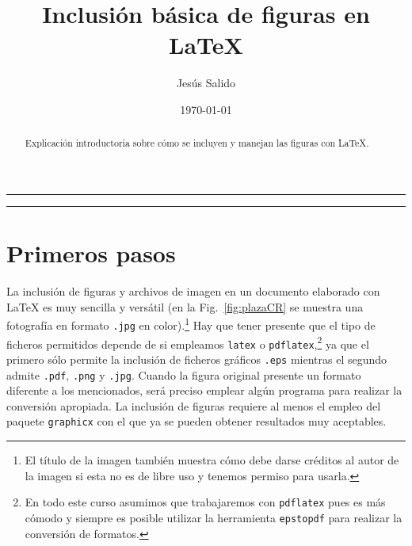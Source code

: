 \documentclass[11pt,a4paper]{article}
\author{Jesús Salido}
\title{Inclusión básica de figuras en \LaTeX{}}
\date{\today}
\begin{document}
\maketitle

\begin{abstract}
	Explicación introductoria sobre cómo se incluyen y manejan las figuras con \LaTeX{}.
\end{abstract}

\hrule
\tableofcontents
\listoffigures
\bigskip
\hrule

\section{Primeros pasos}
La inclusión de figuras y archivos de imagen en un documento elaborado con \LaTeX{} es muy sencilla y versátil (en la Fig.~\ref{fig:plazaCR} se muestra una fotografía en formato \texttt{.jpg} en color).\footnote{El título de la imagen también muestra cómo debe darse créditos al autor de la imagen si esta no es de libre uso y tenemos permiso para usarla.} Hay que tener presente que el tipo de ficheros permitidos depende de si empleamos \texttt{latex} o \texttt{pdflatex},\footnote{En todo este curso asumimos que trabajaremos con \texttt{pdflatex} pues es más cómodo y siempre es posible utilizar la herramienta \texttt{epstopdf} para realizar la conversión de formatos.} ya que el primero sólo permite la inclusión de ficheros gráficos \texttt{.eps} mientras el segundo admite \texttt{.pdf}, \texttt{.png} y \texttt{.jpg}. Cuando la figura original presente un formato diferente a los mencionados, será preciso emplear algún programa para realizar la conversión apropiada. La inclusión de figuras requiere al menos el empleo del paquete \texttt{graphicx} con el que ya se pueden obtener resultados muy aceptables.
\end{document}
